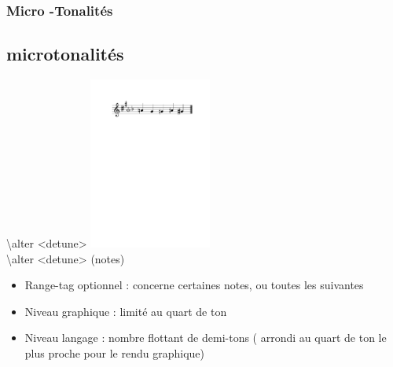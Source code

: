 \documentclass[12pt]{beamer}
\newenvironment{code}
  {\fontfamily{prc}\selectfont}{}
\begin{document}
    \begin{frame}
    \frametitle{Micro -Tonalités}
    \subsection{microtonalités}

    \begin{code} \textbackslash{}alter \textless{}detune\textgreater{} \end{code} \hspace{3cm} \includegraphics[width=4cm]{img/partitions/freekey.pdf} \\
    \begin{code} \textbackslash{}alter \textless{}detune\textgreater{} (notes) \end{code}
    
    
    \vspace{5mm}
    
    \begin{itemize}
      \item Range-tag optionnel : concerne certaines notes, ou toutes les suivantes
      \item Niveau graphique : limité au quart de ton
      \item Niveau langage : nombre flottant de demi-tons ( arrondi au quart de ton le plus proche pour le rendu graphique)
    \end{itemize}
    
    \end{frame}
    
\end{document}
